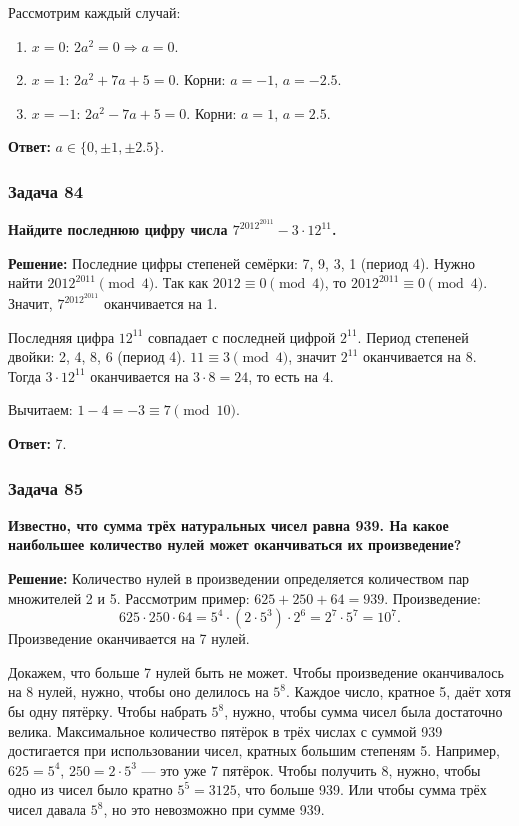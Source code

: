 \documentclass[12pt, a4paper]{article}
\begin{document}
Рассмотрим каждый случай:
\begin{enumerate}
    \item $x = 0$: $2a^2 = 0 \Rightarrow a = 0$.
    \item $x = 1$: $2a^2 + 7a + 5 = 0$. Корни: $a = -1$, $a = -2.5$.
    \item $x = -1$: $2a^2 - 7a + 5 = 0$. Корни: $a = 1$, $a = 2.5$.
\end{enumerate}

\textbf{Ответ:} $a \in \{0, \pm 1, \pm 2.5\}$.

\subsubsection*{Задача 84}
\textbf{Найдите последнюю цифру числа $7^{2012^{2011}} - 3 \cdot 12^{11}$.}

\textbf{Решение:}
Последние цифры степеней семёрки: 7, 9, 3, 1 (период 4). Нужно найти $2012^{2011} \pmod{4}$. Так как $2012 \equiv 0 \pmod{4}$, то $2012^{2011} \equiv 0 \pmod{4}$. Значит, $7^{2012^{2011}}$ оканчивается на 1.

Последняя цифра $12^{11}$ совпадает с последней цифрой $2^{11}$. Период степеней двойки: 2, 4, 8, 6 (период 4). $11 \equiv 3 \pmod{4}$, значит $2^{11}$ оканчивается на 8. Тогда $3 \cdot 12^{11}$ оканчивается на \(3 \cdot 8 = 24\), то есть на 4.

Вычитаем: \(1 - 4 = -3 \equiv 7 \pmod{10}\).

\textbf{Ответ:} 7.

\subsubsection*{Задача 85}
\textbf{Известно, что сумма трёх натуральных чисел равна 939. На какое наибольшее количество нулей может оканчиваться их произведение?}

\textbf{Решение:}
Количество нулей в произведении определяется количеством пар множителей 2 и 5. Рассмотрим пример: $625 + 250 + 64 = 939$. Произведение:
\[
625 \cdot 250 \cdot 64 = 5^4 \cdot (2 \cdot 5^3) \cdot 2^6 = 2^7 \cdot 5^7 = 10^7.
\]
Произведение оканчивается на 7 нулей.

Докажем, что больше 7 нулей быть не может. Чтобы произведение оканчивалось на 8 нулей, нужно, чтобы оно делилось на \(5^8\). Каждое число, кратное 5, даёт хотя бы одну пятёрку. Чтобы набрать \(5^8\), нужно, чтобы сумма чисел была достаточно велика. Максимальное количество пятёрок в трёх числах с суммой 939 достигается при использовании чисел, кратных большим степеням 5. Например, \(625 = 5^4\), \(250 = 2 \cdot 5^3\) — это уже 7 пятёрок. Чтобы получить 8, нужно, чтобы одно из чисел было кратно \(5^5 = 3125\), что больше 939. Или чтобы сумма трёх чисел давала \(5^8\), но это невозможно при сумме 939.
\end{document}
